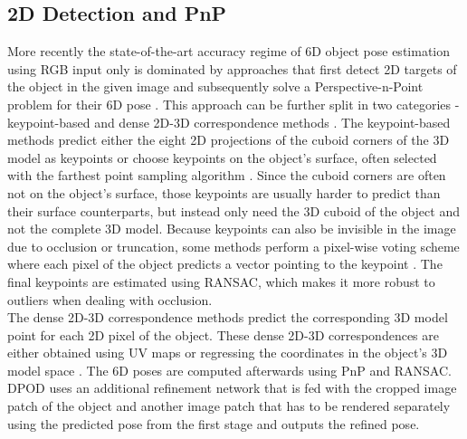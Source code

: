 \documentclass[twocolumn, 10pt, letterpaper]{article}
\begin{document}
\subsection{2D Detection and PnP}
\label{subsection_2d_detection_and_pnp}
More recently the state-of-the-art accuracy regime of 6D object pose estimation using RGB input only is dominated by approaches that first detect 2D targets of the object in the given image and subsequently solve a Perspective-n-Point problem for their 6D pose \cite{PVNet}\cite{HybridPose}\cite{DPOD}\cite{CDPN}\cite{Pix2Pose}\cite{BPnP}. This approach can be further split in two categories - keypoint-based \cite{PVNet}\cite{HybridPose}\cite{BPnP}\cite{BB8}\cite{DOPE}\cite{YOLO6D} and dense 2D-3D correspondence methods \cite{DPOD}\cite{CDPN}\cite{Pix2Pose}. The keypoint-based methods predict either the eight 2D projections of the cuboid corners of the 3D model as keypoints \cite{BB8}\cite{DOPE}\cite{YOLO6D} or choose keypoints on the object's surface, often selected with the farthest point sampling algorithm \cite{PVNet}\cite{HybridPose}\cite{BPnP}. Since the cuboid corners are often not on the object's surface, those keypoints are usually harder to predict than their surface counterparts, but instead only need the 3D cuboid of the object and not the complete 3D model. Because keypoints can also be invisible in the image due to occlusion or truncation, some methods perform a pixel-wise voting scheme where each pixel of the object predicts a vector pointing to the keypoint \cite{PVNet}\cite{HybridPose}. The final keypoints are estimated using RANSAC\cite{RANSAC}, which makes it more robust to outliers when dealing with occlusion.\\

The dense 2D-3D correspondence methods predict the corresponding 3D model point for each 2D pixel of the object. These dense 2D-3D correspondences are either obtained using UV maps \cite{DPOD} or regressing the coordinates in the object's 3D model space \cite{Pix2Pose}\cite{CDPN}. The 6D poses are computed afterwards using PnP and RANSAC. DPOD\cite{DPOD} uses an additional refinement network that is fed with the cropped image patch of the object and another image patch that has to be rendered separately using the predicted pose from the first stage and outputs the refined pose.\\
\end{document}
